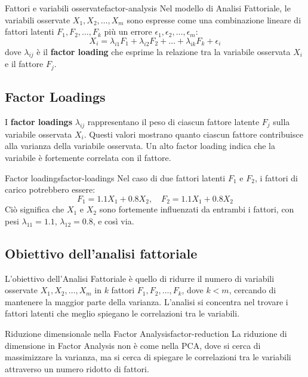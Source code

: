 \begin{definizione}{Fattori e variabili osservate}{factor-analysis}
Nel modello di Analisi Fattoriale, le variabili osservate \( X_1, X_2, \dots, X_m \) sono espresse come una combinazione lineare di fattori latenti \( F_1, F_2, \dots, F_k \) più un errore \( \epsilon_1, \epsilon_2, \dots, \epsilon_m \):
\[
X_i = \lambda_{i1} F_1 + \lambda_{i2} F_2 + \dots + \lambda_{ik} F_k + \epsilon_i
\]
dove \( \lambda_{ij} \) è il \textbf{factor loading} che esprime la relazione tra la variabile osservata \( X_i \) e il fattore \( F_j \).
\end{definizione}

\subsection{Factor Loadings}

I \textbf{factor loadings} \( \lambda_{ij} \) rappresentano il peso di ciascun fattore latente \( F_j \) sulla variabile osservata \( X_i \). Questi valori mostrano quanto ciascun fattore contribuisce alla varianza della variabile osservata. Un alto factor loading indica che la variabile è fortemente correlata con il fattore.

\begin{esempio}{Factor loadings}{factor-loadings}
Nel caso di due fattori latenti \( F_1 \) e \( F_2 \), i fattori di carico potrebbero essere:
\[
F_1 = 1.1 X_1 + 0.8 X_2, \quad F_2 = 1.1 X_1 + 0.8 X_2
\]
Ciò significa che \( X_1 \) e \( X_2 \) sono fortemente influenzati da entrambi i fattori, con pesi \( \lambda_{11} = 1.1 \), \( \lambda_{12} = 0.8 \), e così via.
\end{esempio}

\subsection{Obiettivo dell'analisi fattoriale}

L'obiettivo dell'Analisi Fattoriale è quello di ridurre il numero di variabili osservate \( X_1, X_2, \dots, X_m \) in \( k \) fattori \( F_1, F_2, \dots, F_k \), dove \( k < m \), cercando di mantenere la maggior parte della varianza. L'analisi si concentra nel trovare i fattori latenti che meglio spiegano le correlazioni tra le variabili.

\begin{nota}{Riduzione dimensionale nella Factor Analysis}{factor-reduction}
La riduzione di dimensione in Factor Analysis non è come nella PCA, dove si cerca di massimizzare la varianza, ma si cerca di spiegare le correlazioni tra le variabili attraverso un numero ridotto di fattori.
\end{nota}

